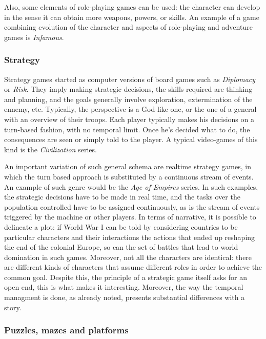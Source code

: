 \documentclass[
		twoside,openright,titlepage,numbers=noenddot,manychapters,
		headinclude,%
                footinclude=false,cleardoublepage=empty,
                BCOR=5mm,
		fontsize=11pt, %
                 enabledeprecatedfontcommands]{scrreprt}
\begin{document}
Also, some elements of role-playing games can be used: the character can develop in the sense it can obtain more weapons, powers, or skills. An example of a game combining evolution of the character and aspects of role-playing and adventure games is \emph{Infamous}.



 
\subsubsection{Strategy}

Strategy games started as computer versions of board games such as \emph{Diplomacy} or \emph{Risk}. They imply making strategic decisions, the skills required are thinking and planning, and the goals generally involve exploration, extermination of the ennemy, etc. Typically, the perspective is a God-like one, or the one of a general with an overview of their troops. Each player typically makes his decisions on a turn-based fashion, with no temporal limit. Once he's decided what to do, the consequences are seen or simply told to the player. A typical video-games of this kind is the \emph{Civilization} series. 

An important variation of such general schema are realtime strategy games, in which the turn based approach is substituted by a continuous stream of events. An example of such genre would be the \emph{Age of Empires} series. In such examples, the strategic decisions have to be made in real time, and the tasks over the population controlled have to be assigned continuously, as is the stream of events triggered by the machine or other players. In terms of narrative, it is possible to delineate a plot: if World War I can be told by considering countries to be particular characters and their interactions the actions that ended up reshaping the end of the colonial Europe, so can the set of battles that lead to world domination in such games. Moreover, not all the characters are identical: there are different kinds of characters that assume different roles in order to achieve the common goal. Despite this, the principle of a strategic game itself asks for an open end, this is what makes it interesting.   Moreover, the way the temporal managment is done,  as \cite{pearce2002story}  already noted, presents substantial differences with a story. 


\subsubsection{Puzzles, mazes and platforms}
\end{document}
